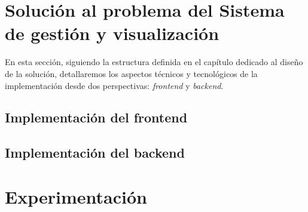 \section{Solución al problema del Sistema de gestión y visualización}
En esta sección, siguiendo la estructura definida en el capítulo dedicado al diseño de la solución, 
detallaremos los aspectos técnicos y tecnológicos de la implementación desde dos perspectivas: 
\textit{frontend} y \textit{backend}.


\subsection{Implementación del frontend}

\subsection{Implementación del backend}



\section{Experimentación}